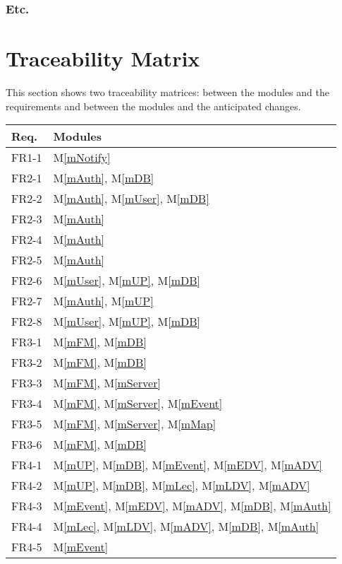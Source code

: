 \documentclass[12pt, titlepage]{article}
\newcommand{\mref}[1]{M\ref{#1}}
\begin{document}
\subsubsection{Etc.}

\section{Traceability Matrix} \label{SecTM}

This section shows two traceability matrices: between the modules and the
requirements and between the modules and the anticipated changes.

\begin{table}[H]
\centering
\begin{tabular}{p{} p{}}
\toprule
\textbf{Req.} & \textbf{Modules}\\
\midrule
FR1-1 & \mref{mNotify}\\
FR2-1 & \mref{mAuth}, \mref{mDB}\\
FR2-2 & \mref{mAuth}, \mref{mUser}, \mref{mDB}\\
FR2-3 & \mref{mAuth}\\
FR2-4 & \mref{mAuth}\\
FR2-5 & \mref{mAuth}\\
FR2-6 & \mref{mUser}, \mref{mUP}, \mref{mDB}\\
FR2-7 & \mref{mAuth}, \mref{mUP}\\
FR2-8 & \mref{mUser}, \mref{mUP}, \mref{mDB}\\
FR3-1 & \mref{mFM}, \mref{mDB}\\
FR3-2 & \mref{mFM}, \mref{mDB}\\
FR3-3 & \mref{mFM}, \mref{mServer}\\
FR3-4 & \mref{mFM}, \mref{mServer}, \mref{mEvent}\\
FR3-5 & \mref{mFM}, \mref{mServer}, \mref{mMap}\\
FR3-6 & \mref{mFM}, \mref{mDB}\\
FR4-1 & \mref{mUP}, \mref{mDB}, \mref{mEvent}, \mref{mEDV}, \mref{mADV}\\
FR4-2 & \mref{mUP}, \mref{mDB}, \mref{mLec}, \mref{mLDV}, \mref{mADV}\\
FR4-3 & \mref{mEvent}, \mref{mEDV}, \mref{mADV}, \mref{mDB}, \mref{mAuth}\\
FR4-4 & \mref{mLec}, \mref{mLDV}, \mref{mADV}, \mref{mDB}, \mref{mAuth}\\
FR4-5 & \mref{mEvent}\\

\end{tabular}
\end{table}
\end{document}
